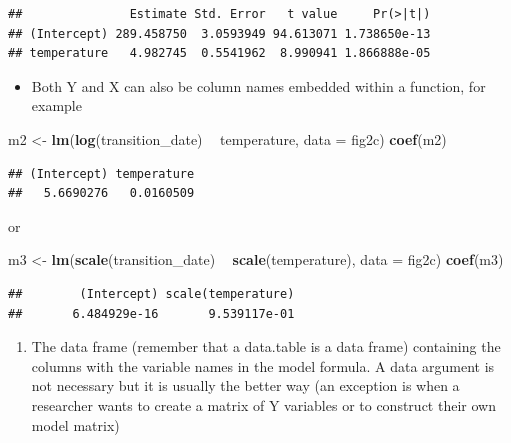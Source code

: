 \documentclass[]{book}
\newenvironment{Shaded}{\begin{snugshade}}{\end{snugshade}}
\newcommand{\DataTypeTok}[1]{\textcolor[rgb]{0.13,0.29,0.53}{#1}}
\newcommand{\KeywordTok}[1]{\textcolor[rgb]{0.13,0.29,0.53}{\textbf{#1}}}
\newcommand{\NormalTok}[1]{#1}
\newcommand{\OperatorTok}[1]{\textcolor[rgb]{0.81,0.36,0.00}{\textbf{#1}}}
\newcommand{\StringTok}[1]{\textcolor[rgb]{0.31,0.60,0.02}{#1}}
\providecommand{\tightlist}{%
  \setlength{\itemsep}{0pt}\setlength{\parskip}{0pt}}
\begin{document}
\begin{verbatim}
##               Estimate Std. Error   t value     Pr(>|t|)
## (Intercept) 289.458750  3.0593949 94.613071 1.738650e-13
## temperature   4.982745  0.5541962  8.990941 1.866888e-05
\end{verbatim}

\begin{itemize}
\tightlist
\item
  Both Y and X can also be column names embedded within a function, for example
\end{itemize}

\begin{Shaded}
\begin{Highlighting}[]
\NormalTok{m2 <-}\StringTok{ }\KeywordTok{lm}\NormalTok{(}\KeywordTok{log}\NormalTok{(transition_date) }\OperatorTok{~}\StringTok{ }\NormalTok{temperature, }\DataTypeTok{data =}\NormalTok{ fig2c)}
\KeywordTok{coef}\NormalTok{(m2)}
\end{Highlighting}
\end{Shaded}

\begin{verbatim}
## (Intercept) temperature 
##   5.6690276   0.0160509
\end{verbatim}

or

\begin{Shaded}
\begin{Highlighting}[]
\NormalTok{m3 <-}\StringTok{ }\KeywordTok{lm}\NormalTok{(}\KeywordTok{scale}\NormalTok{(transition_date) }\OperatorTok{~}\StringTok{ }\KeywordTok{scale}\NormalTok{(temperature), }\DataTypeTok{data =}\NormalTok{ fig2c)}
\KeywordTok{coef}\NormalTok{(m3)}
\end{Highlighting}
\end{Shaded}

\begin{verbatim}
##        (Intercept) scale(temperature) 
##       6.484929e-16       9.539117e-01
\end{verbatim}

\begin{enumerate}
\def\labelenumi{\arabic{enumi}.}
\setcounter{enumi}{1}
\tightlist
\item
  The data frame (remember that a data.table is a data frame) containing the columns with the variable names in the model formula. A data argument is not necessary but it is usually the better way (an exception is when a researcher wants to create a matrix of Y variables or to construct their own model matrix)
\end{enumerate}
\end{document}
